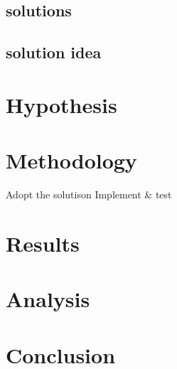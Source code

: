 \documentclass[english]{tktltiki2}
\theoremstyle{definition}
\theoremstyle{remark}
\begin{document}
\subsection{solutions}

\subsection{solution idea}




\section{Hypothesis}
\section{Methodology}
Adopt the solutison
Implement & test

\section{Results}
\section{Analysis}
\section{Conclusion}


%
%
% 
%







% 
\end{document}
